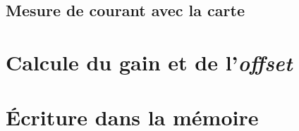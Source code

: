 \subsection{Mesure de courant avec la carte}



\section{Calcule du gain et de l'\textit{offset}}





\section{Écriture dans la mémoire}



